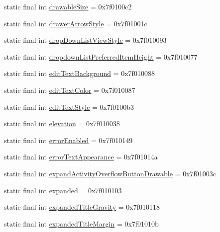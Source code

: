 \begin{CompactItemize}
\item 
static final int \hyperlink{classandroid_1_1support_1_1transition_1_1_r_1_1attr_7bd9721bc40ab37fd43f9151b9e02fd3}{drawableSize} = 0x7f0100c2
\item 
static final int \hyperlink{classandroid_1_1support_1_1transition_1_1_r_1_1attr_758067761e5929030917ee0c2d6def12}{drawerArrowStyle} = 0x7f01001c
\item 
static final int \hyperlink{classandroid_1_1support_1_1transition_1_1_r_1_1attr_d55fb67931921c64e52d62aec85c9223}{dropDownListViewStyle} = 0x7f010093
\item 
static final int \hyperlink{classandroid_1_1support_1_1transition_1_1_r_1_1attr_f0f080152ab0053cb4011af8255ca699}{dropdownListPreferredItemHeight} = 0x7f010077
\item 
static final int \hyperlink{classandroid_1_1support_1_1transition_1_1_r_1_1attr_955a45a2f0ab5cde44fa9da1e7765270}{editTextBackground} = 0x7f010088
\item 
static final int \hyperlink{classandroid_1_1support_1_1transition_1_1_r_1_1attr_724bb8998d97912d27678787ddadc939}{editTextColor} = 0x7f010087
\item 
static final int \hyperlink{classandroid_1_1support_1_1transition_1_1_r_1_1attr_b127d1f78699d5d93253a1d6b334193a}{editTextStyle} = 0x7f0100b3
\item 
static final int \hyperlink{classandroid_1_1support_1_1transition_1_1_r_1_1attr_9912a117bca7ecf61653c6e30964055a}{elevation} = 0x7f010038
\item 
static final int \hyperlink{classandroid_1_1support_1_1transition_1_1_r_1_1attr_4e7eead35fe2fe2ddd9cd7aa45dd7fa4}{errorEnabled} = 0x7f010149
\item 
static final int \hyperlink{classandroid_1_1support_1_1transition_1_1_r_1_1attr_0f4e93fb871cec5457e18791cf90699c}{errorTextAppearance} = 0x7f01014a
\item 
static final int \hyperlink{classandroid_1_1support_1_1transition_1_1_r_1_1attr_bedbdb3d8e06654105fcb7ab2e300f05}{expandActivityOverflowButtonDrawable} = 0x7f01003c
\item 
static final int \hyperlink{classandroid_1_1support_1_1transition_1_1_r_1_1attr_bd5c9d65a751ed823315a3f2022d47a2}{expanded} = 0x7f010103
\item 
static final int \hyperlink{classandroid_1_1support_1_1transition_1_1_r_1_1attr_729c6a17e0954df1466c5e76b0f74187}{expandedTitleGravity} = 0x7f010118
\item 
static final int \hyperlink{classandroid_1_1support_1_1transition_1_1_r_1_1attr_bfc0b4c55e188ccdfe4edbb79d8dedc8}{expandedTitleMargin} = 0x7f01010b

\end{CompactItemize}

